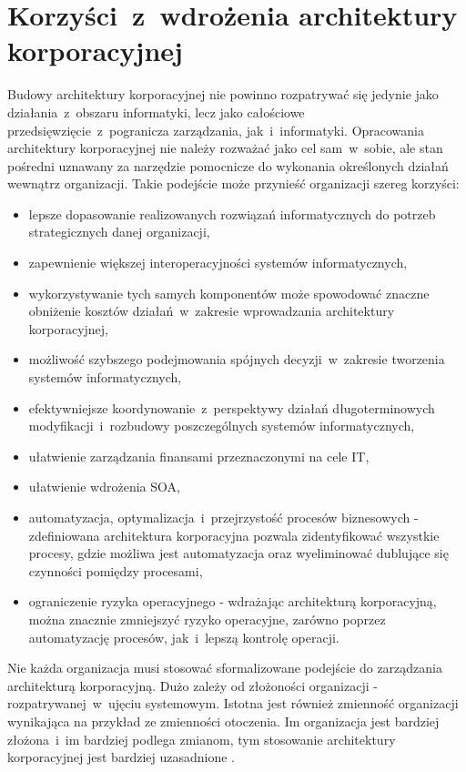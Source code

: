 \section{Korzyści~z~wdrożenia architektury korporacyjnej}
Budowy architektury korporacyjnej nie powinno rozpatrywać się jedynie jako działania~z~obszaru informatyki, lecz jako całościowe przedsięwzięcie~z~pogranicza zarządzania, jak~i~informatyki. Opracowania architektury korporacyjnej nie należy rozważać jako cel sam~w~sobie, ale stan pośredni uznawany za narzędzie pomocnicze do wykonania określonych działań wewnątrz organizacji. Takie podejście może przynieść organizacji szereg korzyści:
\begin{itemize}
\item{lepsze dopasowanie realizowanych rozwiązań informatycznych do potrzeb strategicznych danej organizacji,}
\item{zapewnienie większej interoperacyjności systemów informatycznych,}
\item{wykorzystywanie tych samych komponentów może spowodować znaczne obniżenie kosztów działań~w~zakresie wprowadzania architektury korporacyjnej,}
\item{możliwość szybszego podejmowania spójnych decyzji~w~zakresie tworzenia systemów informatycznych,}
\item{efektywniejsze koordynowanie~z~perspektywy działań długoterminowych modyfikacji~i~rozbudowy poszczególnych systemów informatycznych,}
\item{ułatwienie zarządzania finansami przeznaczonymi na cele IT,}
\item{ułatwienie wdrożenia SOA,}
\item{automatyzacja, optymalizacja~i~przejrzystość procesów biznesowych - zdefiniowana architektura korporacyjna pozwala zidentyfikować wszystkie procesy, gdzie możliwa jest automatyzacja oraz wyeliminować dublujące się czynności pomiędzy procesami,}
\item{ograniczenie ryzyka operacyjnego - wdrażając architekturą korporacyjną, można znacznie zmniejszyć ryzyko operacyjne, zarówno poprzez automatyzację procesów, jak~i~lepszą kontrolę operacji.}
\end{itemize}

Nie każda organizacja musi stosować sformalizowane podejście do zarządzania architekturą korporacyjną. Dużo zależy od złożoności organizacji - rozpatrywanej~w~ujęciu systemowym. Istotna jest również zmienność organizacji wynikająca na przykład ze zmienności otoczenia. Im organizacja jest bardziej złożona~i~im bardziej podlega zmianom, tym stosowanie architektury korporacyjnej jest bardziej uzasadnione \cite{ArchKorpSob}.

